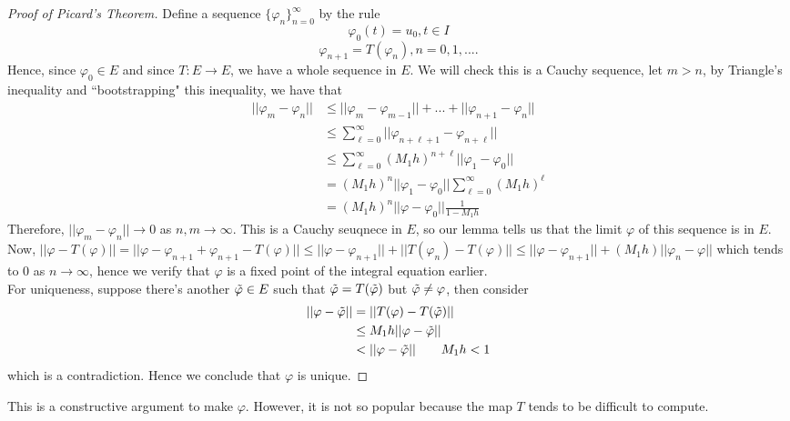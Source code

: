 \documentclass{article}
\begin{document}
\begin{proof}[Proof of Picard's Theorem]
    Define a sequence $\{\varphi_n\}_{n=0}^\infty$ by the rule
    \[\varphi_0(t) = u_0, t \in I\]
    \[\varphi_{n+1} = T(\varphi_n), n = 0, 1, ....\]
    Hence, since $\varphi_0 \in E$ and since $T: E \to E$, we have a whole sequence in $E$. We will check this is a Cauchy sequence, let $m > n$, by Triangle's inequality and ``bootstrapping" this inequality, we have that
    \begin{align*}
        ||\varphi_m - \varphi_n|| &\leq ||\varphi_{m} - \varphi_{m-1}|| + ... + ||\varphi_{n+1} - \varphi_n||\\
        &\leq \sum_{\ell = 0}^\infty ||\varphi_{n + \ell + 1} - \varphi_{n + \ell}|| \\
        &\leq \sum_{\ell = 0}^\infty (M_1 h)^{n+\ell} ||\varphi_1 - \varphi_0||  \tag*{Using $(*)$}\\
        &= (M_1 h)^n  ||\varphi_1 - \varphi_0|| \sum_{\ell = 0}^\infty (M_1 h)^{\ell}\\
        &= (M_1 h)^n ||\varphi - \varphi_0|| \frac{1}{1 - M_1 h}
    \end{align*}
    Therefore, $||\varphi_m - \varphi_n|| \to 0$ as $n, m \to \infty$. This is a Cauchy seuqnece in $E$, so our lemma tells us that the limit $\varphi$ of this sequence is in $E$.\\

    Now, $||\varphi - T(\varphi)|| = ||\varphi - \varphi_{n+1} + \varphi_{n+1} - T(\varphi)|| \leq ||\varphi - \varphi_{n+1}|| + ||T(\varphi_n) - T(\varphi)|| \leq ||\varphi - \varphi_{n+1}|| + (M_1 h)||\varphi_n - \varphi||$ which tends to $0$ as $n \to \infty$, hence we verify that $\varphi$ is a fixed point of the integral equation earlier.\\

    For uniqueness, suppose there's another $\Tilde{\varphi} \in E$ such that $\Tilde{\varphi} = T(\Tilde{\varphi})$ but $\Tilde{\varphi} \neq \varphi$, then consider
    \begin{align*}
        ||\varphi - \Tilde{\varphi}|| &= ||T(\varphi) - T(\Tilde{\varphi})||\\
        &\leq M_1 h ||\varphi - \Tilde{\varphi}||\\
        &< ||\varphi - \Tilde{\varphi}|| \tag*{$M_1 h < 1$}
    \end{align*}
    which is a contradiction. Hence we conclude that $\varphi$ is unique.
\end{proof}

\begin{remark}
    This is a constructive argument to make $\varphi$. However, it is not so popular because the map $T$ tends to be difficult to compute.
\end{remark}

\end{document}
